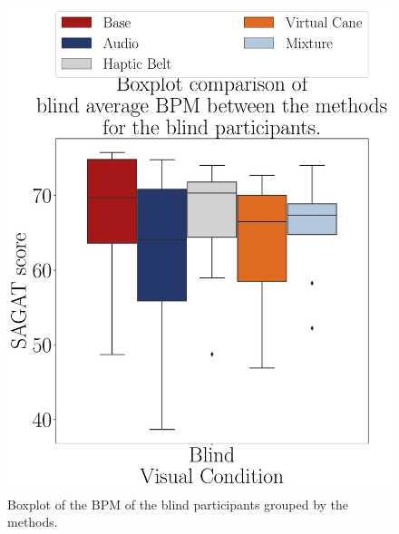 \begin{figure}[!htb]
    \centering
    \begin{minipage}{0.45\textwidth}
        \centering
        \includegraphics[width = \textwidth]{Resultados/ECG/Figuras/pdf/boxplot_ecg_bpm_blind_scene.pdf}
        \caption{Boxplot of the BPM of the blind participants grouped by the methods.}
        \label{fig:boxplot_ecg_bpm_blind_scene}
    \end{minipage}
    \begin{minipage}{0.075\textwidth}
        \hfill
    \end{minipage}
    \begin{minipage}{0.45\textwidth}
        \centering

\end{minipage}
\end{figure}
